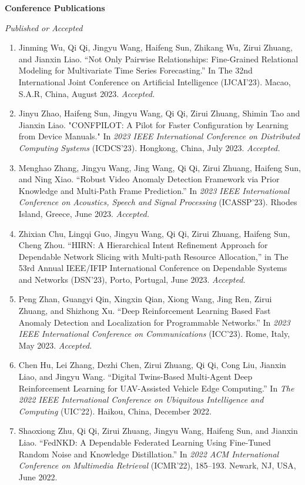 \documentclass[letterpaper,11pt]{article}
\newcommand{\contentlength}{5.5in}
\begin{document}
\begin{tcolorbox}[flush right,breakable,colback=white,colframe=white,width=\contentlength]
		\textbf{Conference Publications}
		
		\textit{Published or Accepted}
		\begin{enumerate}[itemsep=0mm]
			\item Jinming Wu, Qi Qi, Jingyu Wang, Haifeng Sun, Zhikang Wu, Zirui Zhuang, and Jianxin Liao. “Not Only Pairwise Relationships: Fine-Grained Relational Modeling for Multivariate Time Series Forecasting.” In The 32nd International Joint Conference on Artificial Intelligence (IJCAI'23). Macao, S.A.R, China, August 2023. \textit{Accepted.}
			\item Jinyu Zhao, Haifeng Sun, Jingyu Wang, Qi Qi, Zirui Zhuang, Shimin Tao and Jianxin Liao. "CONFPILOT: A Pilot for Faster Configuration by Learning from Device Manuals." In \textit{2023 IEEE International Conference on Distributed Computing Systems} (ICDCS'23). Hongkong, China, July 2023. \textit{Accepted.}
			\item Menghao Zhang, Jingyu Wang, Jing Wang, Qi Qi, Zirui Zhuang, Haifeng Sun, and Ning Xiao. “Robust Video Anomaly Detection Framework via Prior Knowledge and Multi-Path Frame Prediction.” In \textit{2023 IEEE International Conference on Acoustics, Speech and Signal Processing} (ICASSP’23). Rhodes Island, Greece, June 2023. \textit{Accepted.}
			\item Zhixian Chu, Lingqi Guo, Jingyu Wang, Qi Qi, Zirui Zhuang, Haifeng Sun, Cheng Zhou. “HIRN: A Hierarchical Intent Refinement Approach for Dependable Network Slicing with Multi-path Resource Allocation,” in The 53rd Annual IEEE/IFIP International Conference on Dependable Systems and Networks (DSN’23), Porto, Portugal, June 2023. \textit{Accepted.}
			\item Peng Zhan, Guangyi Qin, Xingxin Qian, Xiong Wang, Jing Ren, Zirui Zhuang, and Shizhong Xu. “Deep Reinforcement Learning Based Fast Anomaly Detection and Localization for Programmable Networks.” In \textit{2023 IEEE International Conference on Communications} (ICC’23). Rome, Italy, May 2023. \textit{Accepted.}
			\item Chen Hu, Lei Zhang, Dezhi Chen, Zirui Zhuang, Qi Qi, Cong Liu, Jianxin Liao, and Jingyu Wang. “Digital Twins-Based Multi-Agent Deep Reinforcement Learning for UAV-Assisted Vehicle Edge Computing.” In \textit{The 2022 IEEE International Conference on Ubiquitous Intelligence and Computing} (UIC’22). Haikou, China, December 2022.
			\item Shaoxiong Zhu, Qi Qi, Zirui Zhuang, Jingyu Wang, Haifeng Sun, and Jianxin Liao. “FedNKD: A Dependable Federated Learning Using Fine-Tuned Random Noise and Knowledge Distillation.” In \textit{2022 ACM International Conference on Multimedia Retrieval} (ICMR'22), 185–193. Newark, NJ, USA, June 2022.

\end{enumerate}
\end{tcolorbox}
\end{document}
